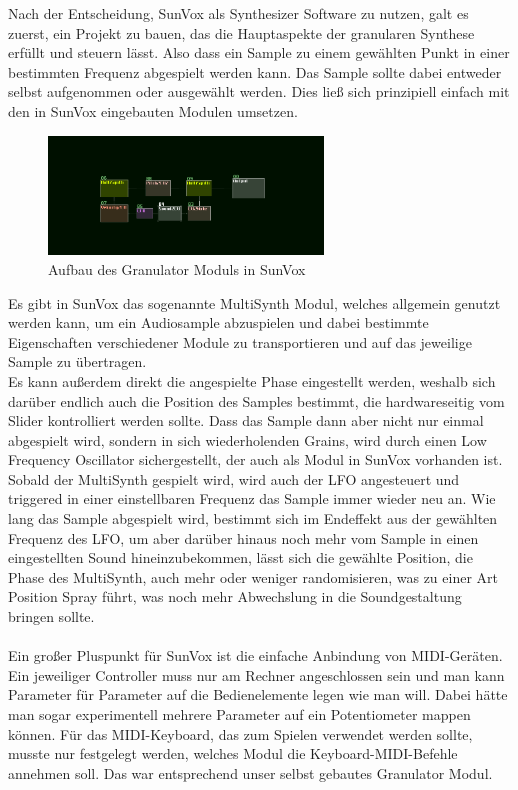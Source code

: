 \documentclass[12pt]{scrartcl}%
\theoremstyle{nonumberplain}
\begin{document}
Nach der Entscheidung, SunVox als Synthesizer Software zu nutzen, galt es zuerst, ein Projekt zu bauen, das die Hauptaspekte der granularen Synthese erfüllt und steuern lässt. Also dass ein Sample zu einem gewählten Punkt in einer bestimmten Frequenz abgespielt werden kann. Das Sample sollte dabei entweder selbst aufgenommen oder ausgewählt werden. Dies ließ sich prinzipiell einfach mit den in SunVox eingebauten Modulen umsetzen.

\begin{figure}
  \centering
  \includegraphics[width=0.65\textwidth]{sunvox_1}
  \caption{Aufbau des Granulator Moduls in SunVox}
\end{figure}
\noindent Es gibt in SunVox das sogenannte MultiSynth Modul, welches allgemein genutzt werden kann, um ein Audiosample abzuspielen und dabei bestimmte Eigenschaften verschiedener Module zu transportieren und auf das jeweilige Sample zu übertragen.\\
Es kann außerdem direkt die angespielte Phase eingestellt werden, weshalb sich darüber endlich auch die Position des Samples bestimmt, die hardwareseitig vom Slider kontrolliert werden sollte. Dass das Sample dann aber nicht nur einmal abgespielt wird, sondern in sich wiederholenden Grains, wird durch einen Low Frequency Oscillator sichergestellt, der auch als Modul in SunVox vorhanden ist. Sobald der MultiSynth gespielt wird, wird auch der LFO angesteuert und triggered in einer einstellbaren Frequenz das Sample immer wieder neu an. Wie lang das Sample abgespielt wird, bestimmt sich im Endeffekt aus der gewählten Frequenz des LFO, um aber darüber hinaus noch mehr vom Sample in einen eingestellten Sound hineinzubekommen, lässt sich die gewählte Position, die Phase des MultiSynth, auch mehr oder weniger randomisieren, was zu einer Art Position Spray führt, was noch mehr Abwechslung in die Soundgestaltung bringen sollte.
\\\\
Ein großer Pluspunkt für SunVox ist die einfache Anbindung von MIDI-Geräten. Ein jeweiliger Controller muss nur am Rechner angeschlossen sein und man kann Parameter für Parameter auf die Bedienelemente legen wie man will. Dabei hätte man sogar experimentell mehrere Parameter auf ein Potentiometer mappen können. Für das MIDI-Keyboard, das zum Spielen verwendet werden sollte, musste nur festgelegt werden, welches Modul die Keyboard-MIDI-Befehle annehmen soll. Das war entsprechend unser selbst gebautes Granulator Modul.\\
\end{document}
